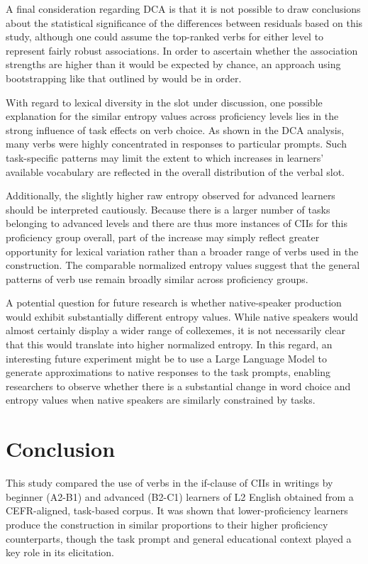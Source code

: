 A final consideration regarding DCA is that it is not possible to draw conclusions about the statistical significance of the differences between residuals based on this study, although one could assume the top-ranked verbs for either level to represent fairly robust associations.
In order to ascertain whether the association strengths are higher than it would be expected by chance, an approach using bootstrapping like that outlined by \cite{griesOverhaulingCollostructionalAnalysis2023} would be in order.

With regard to lexical diversity in the slot under discussion, one possible explanation for the similar entropy values across proficiency levels lies in the strong influence of task effects on verb choice. 
As shown in the DCA analysis, many verbs were highly concentrated in responses to particular prompts.
Such task-specific patterns may limit the extent to which increases in learners' available vocabulary are reflected in the overall distribution of the verbal slot. 


Additionally, the slightly higher raw entropy observed for advanced learners should be interpreted cautiously.
Because there is a larger number of tasks belonging to advanced levels and there are thus more instances of CIIs for this proficiency group overall, part of the increase may simply reflect greater opportunity for lexical variation rather than a broader range of verbs used in the construction.
The comparable normalized entropy values suggest that the general patterns of verb use remain broadly similar across proficiency groups.

A potential question for future research is whether native-speaker production would exhibit substantially different entropy values.
While native speakers would almost certainly display a wider range of collexemes, it is not necessarily clear that this would translate into higher normalized entropy.
In this regard, an interesting future experiment might be to use a Large Language Model to generate approximations to native responses to the task prompts,
enabling researchers to observe whether there is a substantial change in word choice and entropy values when native speakers are similarly constrained by tasks.

\section{Conclusion}

This study compared the use of verbs in the if-clause of CIIs in writings by beginner (A2-B1) and advanced (B2-C1) learners of L2 English obtained from a CEFR-aligned, task-based corpus.
It was shown that lower-proficiency learners produce the construction in similar proportions to their higher proficiency counterparts, though the task prompt and general educational context played a key role in its elicitation.

